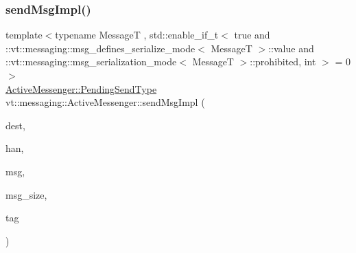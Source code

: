 \subsubsection{\texorpdfstring{send\+Msg\+Impl()}{sendMsgImpl()}\hspace{0.1cm}{\footnotesize\ttfamily [4/4]}}
{\footnotesize\ttfamily template$<$typename MessageT , std\+::enable\+\_\+if\+\_\+t$<$ true and \+::vt\+::messaging\+::msg\+\_\+defines\+\_\+serialize\+\_\+mode$<$ Message\+T $>$\+::value and \+::vt\+::messaging\+::msg\+\_\+serialization\+\_\+mode$<$ Message\+T $>$\+::prohibited, int $>$  = 0$>$ \\
\hyperlink{structvt_1_1messaging_1_1_active_messenger_a3626a6ca76d8ad4ec7c3b47a2c70d3a8}{Active\+Messenger\+::\+Pending\+Send\+Type} vt\+::messaging\+::\+Active\+Messenger\+::send\+Msg\+Impl (\begin{DoxyParamCaption}\item[{\hyperlink{namespacevt_a866da9d0efc19c0a1ce79e9e492f47e2}{Node\+Type}}]{dest,  }\item[{\hyperlink{namespacevt_af64846b57dfcaf104da3ef6967917573}{Handler\+Type}}]{han,  }\item[{\hyperlink{structvt_1_1messaging_1_1_msg_shared_ptr}{Msg\+Shared\+Ptr}$<$ MessageT $>$ \&}]{msg,  }\item[{\hyperlink{namespacevt_aab8d55968084610ce3b17057981e9300}{Byte\+Type}}]{msg\+\_\+size,  }\item[{\hyperlink{namespacevt_a84ab281dae04a52a4b243d6bf62d0e52}{Tag\+Type}}]{tag }\end{DoxyParamCaption})\hspace{0.3cm}{\ttfamily [inline]}}

\mbox{\label{structvt_1_1messaging_1_1_active_messenger_aa4c842c0d4ae6c277201aef4da383456}} 
